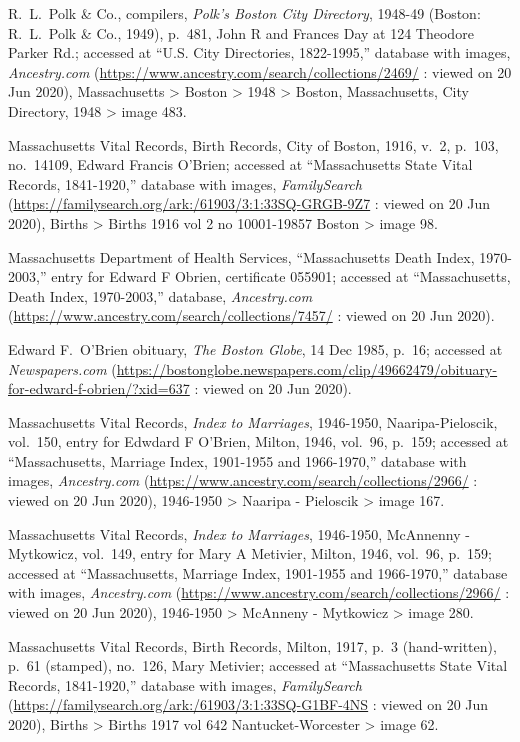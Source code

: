 \begin{thebibliography}{999}
R.\ L.\ Polk \& Co., compilers, \textit{Polk's Boston City Directory}, 1948-49 (Boston: R.\ L.\ Polk \& Co., 1949), p.\ 481, John R and Frances Day at 124 Theodore Parker Rd.; accessed at ``U.S. City Directories, 1822-1995,'' database with images, \textit{Ancestry.com} (\url{https://www.ancestry.com/search/collections/2469/} : viewed on 20 Jun 2020), Massachusetts > Boston > 1948 > Boston, Massachusetts, City Directory, 1948 > image 483.


Massachusetts Vital Records, Birth Records, City of Boston, 1916, v.\ 2, p.\ 103, no.\ 14109, Edward Francis O'Brien; accessed at ``Massachusetts State Vital Records, 1841-1920,'' database with images, \textit{FamilySearch} (\url{https://familysearch.org/ark:/61903/3:1:33SQ-GRGB-9Z7} : viewed on 20 Jun 2020), Births > Births 1916 vol 2 no 10001-19857 Boston > image 98.

Massachusetts Department of Health Services, ``Massachusetts Death Index, 1970-2003,'' entry for Edward F Obrien, certificate 055901; accessed at ``Massachusetts, Death Index, 1970-2003,'' database, \textit{Ancestry.com} (\url{https://www.ancestry.com/search/collections/7457/} : viewed on 20 Jun 2020).

Edward F.\ O'Brien obituary, \textit{The Boston Globe}, 14 Dec 1985, p.\ 16; accessed at \textit{Newspapers.com} (\url{https://bostonglobe.newspapers.com/clip/49662479/obituary-for-edward-f-obrien/?xid=637} : viewed on 20 Jun 2020).

Massachusetts Vital Records, \textit{Index to Marriages}, 1946-1950, Naaripa-Pieloscik, vol.\ 150, entry for Edwdard F O'Brien, Milton, 1946, vol.\ 96, p.\ 159; accessed at ``Massachusetts, Marriage Index, 1901-1955 and 1966-1970,'' database with images, \textit{Ancestry.com} (\url{https://www.ancestry.com/search/collections/2966/} : viewed on 20 Jun 2020), 1946-1950 > Naaripa - Pieloscik > image 167.

Massachusetts Vital Records, \textit{Index to Marriages}, 1946-1950, McAnnenny - Mytkowicz, vol.\ 149, entry for Mary A Metivier, Milton, 1946, vol.\ 96, p.\ 159; accessed at ``Massachusetts, Marriage Index, 1901-1955 and 1966-1970,'' database with images, \textit{Ancestry.com} (\url{https://www.ancestry.com/search/collections/2966/} : viewed on 20 Jun 2020), 1946-1950 > McAnneny - Mytkowicz > image 280.

Massachusetts Vital Records, Birth Records, Milton, 1917, p.\ 3 (hand-written), p.\ 61 (stamped), no.\ 126, Mary Metivier; accessed at ``Massachusetts State Vital Records, 1841-1920,'' database with images, \textit{FamilySearch} (\url{https://familysearch.org/ark:/61903/3:1:33SQ-G1BF-4NS} : viewed on 20 Jun 2020), Births > Births 1917 vol 642 Nantucket-Worcester > image 62.


\end{thebibliography}
